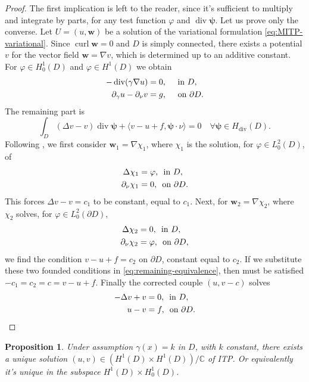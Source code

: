 \documentclass[10pt, a4paper, twoside, openright]{book}
\theoremstyle{definition}
\theoremstyle{plain}
\theoremstyle{plain}
\theoremstyle{plain}
\newtheorem{proposition}[subsection]{Proposition}
\theoremstyle{plain}
\theoremstyle{plain}
\theoremstyle{plain}
\theoremstyle{plain}
\theoremstyle{plain}
\DeclareMathOperator{\divergence}{div}
\DeclareMathOperator{\curl}{curl}
\let\phi\varphi
\begin{document}
\begin{proof}
 The first implication is left to the reader, since it's sufficient to multiply and integrate by parts, 
 for any test function $\phi$ and $\divergence\bm \psi$. Let us prove only the converse.
 Let $U=(u, \bm w)$ be a solution of the variational formulation \eqref{eq:MITP-variational}. 
 Since $\curl \bm w=0$ and $D$ is simply connected, there exists a potential $v$ 
 for the vector field $\bm w = \nabla v$, which is determined up to an additive constant. 
 For $\phi\in H^1_0(D)$ and $\phi\in H^1(D)$ we obtain
 \begin{align}
  -\divergence(\gamma\nabla u)&=0,\quad\textup{ in }D, \\
  \partial_\gamma u - \partial_\nu v&= g,\quad\textup{ on }\partial D.
 \end{align}
 The remaining part is
 \begin{equation}
 \label{eq:remaining-equivalence}
  \int_D(\Delta v - v)\divergence\bm\psi + \langle v-u + f,\bm\psi\cdot\nu\rangle = 0 \quad \forall\bm\psi\in H_{\divergence}(D).
 \end{equation}
Following \cite{cakoni-colton-haddar:lsm}, we first consider $\bm w_1 = \nabla \chi_1 $, 
where $\chi_1$ is the solution, for $\phi \in L^2_0(D)$, of
\begin{align}
 \Delta \chi_1 &= \phi, \, \textup{ in }D,\\
 \partial_\nu \chi_1 &= 0,\, \textup{ on }\partial D.
\end{align}
This forces $\Delta v - v = c_1$ to be constant, equal to $c_1$. Next, for $\bm w_2 = \nabla\chi_2$, where $\chi_2$ solves, for $\phi\in L^2_0(\partial D)$,
\begin{align}
 \Delta \chi_2 &= 0, \, \textup{ in }D,\\
 \partial_\nu \chi_2 &= \phi,\, \textup{ on }\partial D,
\end{align}
we find the condition $v-u+f=c_2$ on $\partial D$, constant equal to $c_2$. 
If we substitute these two founded conditions in \eqref{eq:remaining-equivalence}, 
then must be satisfied $-c_1=c_2=c=v-u+f$. Finally the corrected couple $(u,v-c)$ solves
 \begin{align}
  - \Delta v + v&=0,\,\textup{ in } D,\\
  u-v &= f,\,\textup{ on }\partial D.
 \end{align}
\end{proof}
\begin{proposition}
\label{prop:ITP-ex-un}
 Under assumption $\gamma(x)=k$ in $D$, with $k$ constant, there exists a unique solution $(u,v)\in(H^1(D) \times H^1(D))/\mathbb{C}$ of ITP. Or equivalently it's unique in the subspace $H^1(D)\times H^1_0(D)$.
\end{proposition}
\end{document}
